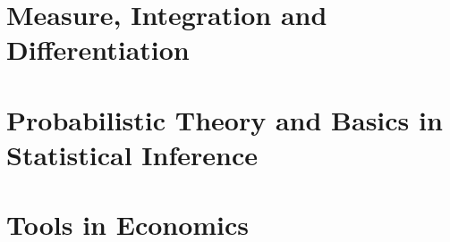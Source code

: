\documentclass{myBook}
\begin{document}
\part{Measure, Integration and Differentiation}


\part{Probabilistic Theory and Basics in Statistical Inference}


\part{Tools in Economics}





\appendix








\end{document}
